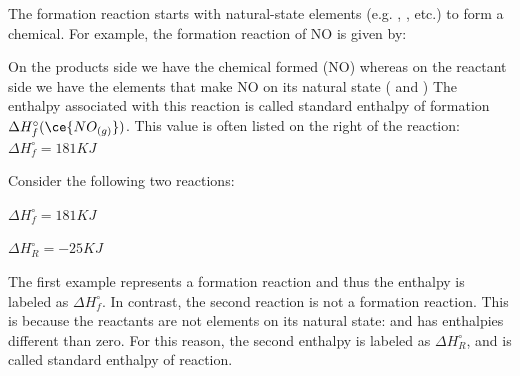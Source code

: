 \documentclass[main.tex]{subfiles}
\begin{document}
\begin{description}
The formation reaction starts with natural-state elements (e.g. , , etc.) to form a chemical. For example, the formation reaction of NO is given by:
\begin{center}\end{center}
On the products side we have the chemical formed (NO) whereas on the reactant side we have the elements that make NO on its natural state ( and )
The enthalpy associated with this reaction is called standard enthalpy of formation $\Delta H_f^{\circ}(\ce{NO_{(g)}})$. This value is often listed on the right of the reaction:\\
 \hspace*{0pt}\hfill $\Delta H^{\circ}_f=181KJ$
 \item[\docfilehook{ $\Delta H^{\circ}_R$ and $\Delta H^{\circ}_f$ }{$\Delta H^{\circ}_R$ and $\Delta H^{\circ}_f$ }]
Consider the following two reactions:
\begin{center} \hspace*{0pt}\hfill $\Delta H^{\circ}_f=181KJ$\end{center}
\begin{center} \hspace*{0pt}\hfill $\Delta H^{\circ}_R=-25KJ$\end{center}
The first example represents a formation reaction and thus the enthalpy is labeled as $\Delta H^{\circ}_f$. In contrast, the second reaction is not a formation reaction. This is because the reactants are not elements on its natural state:  and  has enthalpies different than zero. For this reason, the second enthalpy is labeled as $\Delta H^{\circ}_R$, and is called standard enthalpy of reaction.

\end{description}
\end{document}
